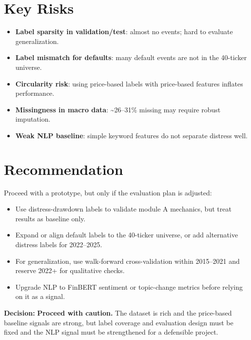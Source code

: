 \documentclass[11pt]{article}
\begin{document}
\section*{Key Risks}
\begin{itemize}
  \item \textbf{Label sparsity in validation/test}: almost no events; hard to evaluate generalization.
  \item \textbf{Label mismatch for defaults}: many default events are not in the 40-ticker universe.
  \item \textbf{Circularity risk}: using price-based labels with price-based features inflates performance.
  \item \textbf{Missingness in macro data}: \textasciitilde 26--31\% missing may require robust imputation.
  \item \textbf{Weak NLP baseline}: simple keyword features do not separate distress well.
\end{itemize}

\section*{Recommendation}
Proceed with a prototype, but only if the evaluation plan is adjusted:
\begin{itemize}
  \item Use distress-drawdown labels to validate module A mechanics, but treat results as baseline only.
  \item Expand or align default labels to the 40-ticker universe, or add alternative distress labels for 2022--2025.
  \item For generalization, use walk-forward cross-validation within 2015--2021 and reserve 2022+ for qualitative checks.
  \item Upgrade NLP to FinBERT sentiment or topic-change metrics before relying on it as a signal.
\end{itemize}

\textbf{Decision:} \textbf{Proceed with caution.} The dataset is rich and the price-based baseline signals are strong, but label coverage and evaluation design must be fixed and the NLP signal must be strengthened for a defensible project.
\end{document}
